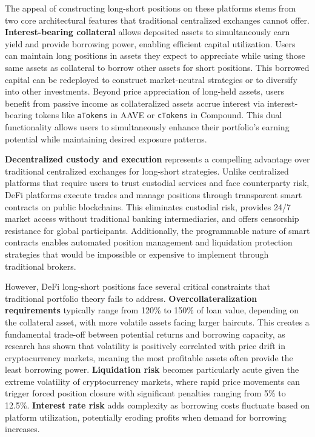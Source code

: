 \documentclass{article}
\theoremstyle{definition}
\begin{document}
The appeal of constructing long-short positions on these platforms stems from two core architectural features that traditional centralized exchanges cannot offer. \textbf{Interest-bearing collateral} allows deposited assets to simultaneously earn yield and provide borrowing power, enabling efficient capital utilization. Users can maintain long positions in assets they expect to appreciate while using those same assets as collateral to borrow other assets for short positions. This borrowed capital can be redeployed to construct market-neutral strategies or to diversify into other investments. Beyond price appreciation of long-held assets, users benefit from passive income as collateralized assets accrue interest via interest-bearing tokens like \texttt{aTokens} in AAVE or \texttt{cTokens} in Compound. This dual functionality allows users to simultaneously enhance their portfolio's earning potential while maintaining desired exposure patterns.

\textbf{Decentralized custody and execution} represents a compelling advantage over traditional centralized exchanges for long-short strategies. Unlike centralized platforms that require users to trust custodial services and face counterparty risk, DeFi platforms execute trades and manage positions through transparent smart contracts on public blockchains. This eliminates custodial risk, provides 24/7 market access without traditional banking intermediaries, and offers censorship resistance for global participants. Additionally, the programmable nature of smart contracts enables automated position management and liquidation protection strategies that would be impossible or expensive to implement through traditional brokers.

However, DeFi long-short positions face several critical constraints that traditional portfolio theory fails to address. \textbf{Overcollateralization requirements} typically range from 120\% to 150\% of loan value, depending on the collateral asset, with more volatile assets facing larger haircuts. This creates a fundamental trade-off between potential returns and borrowing capacity, as research has shown that volatility is positively correlated with price drift in cryptocurrency markets, meaning the most profitable assets often provide the least borrowing power. \textbf{Liquidation risk} becomes particularly acute given the extreme volatility of cryptocurrency markets, where rapid price movements can trigger forced position closure with significant penalties ranging from 5\% to 12.5\%. \textbf{Interest rate risk} adds complexity as borrowing costs fluctuate based on platform utilization, potentially eroding profits when demand for borrowing increases.
\end{document}

